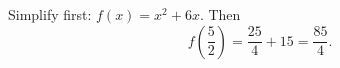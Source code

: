 Simplify first: $f(x)=x^2+6x$. Then
\[f\left(\dfrac{5}{2}\right)=\dfrac{25}{4}+15=\boxed{\dfrac{85}{4}}.\]
